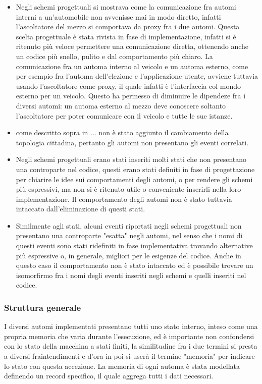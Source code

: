 \begin{itemize}
	\item Negli schemi progettuali si mostrava come la comunicazione fra automi interni a un'automobile non avvenisse mai in modo diretto, infatti l'ascoltatore del mezzo si comportava da proxy fra i due automi. Questa scelta progettuale è stata rivista in fase di implementazione, infatti si è ritenuto più veloce permettere una comunicazione diretta, ottenendo anche un codice più snello, pulito e dal comportamento più chiaro. 
	La comunicazione fra un automa interno al veicolo e un automa esterno, come per esempio fra l'automa dell'elezione e l'applicazione utente, avviene tuttavia usando l'ascoltatore come proxy, il quale infatti è l'interfaccia col mondo esterno per un veicolo. Questo ha permesso di diminuire le dipendeze fra i diversi automi: un automa esterno al mezzo deve conoscere soltanto l'ascoltatore per poter comunicare con il veicolo e tutte le sue istanze.
	\item come descritto sopra in ... non è stato aggiunto il cambiamento della topologia cittadina, pertanto gli automi non presentano gli eventi correlati.
	\item Negli schemi progettuali erano stati inseriti molti stati che non presentano una controparte nel codice, questi erano stati definiti in fase di progettazione per chiarire le idee sui comportamenti degli automi, o per rendere gli schemi più espressivi, ma non si è ritenuto utile o conveniente inserirli nella loro implementazione. Il comportamento degli automi non è stato tuttavia intaccato dall'eliminazione di questi stati. 
	\item Similmente agli stati, alcuni eventi riportati negli schemi progettuali non presentano una controparte "esatta" negli automi, nel senso che i nomi di questi eventi sono stati ridefiniti in fase implementativa trovando alternative più espressive o, in generale, migliori per le esigenze del codice. Anche in questo caso il comportamento non è stato intaccato ed è possibile trovare un isomorfirmo fra i nomi degli eventi inseriti negli schemi e quelli inseriti nel codice.
\end{itemize}

\subsubsection{Struttura generale}
I diversi automi implementati presentano tutti uno stato interno, inteso come una propria memoria che varia durante l'esecuzione, ed è importante non confondersi con lo stato della macchina a stati finiti, la similitudine fra i due termini si presta a diversi fraintendimenti e d'ora in poi si userà il termine "memoria" per indicare lo stato con questa accezione. La memoria di ogni automa è stata modellata definendo un record specifico, il quale aggrega tutti i dati necessari.
 
